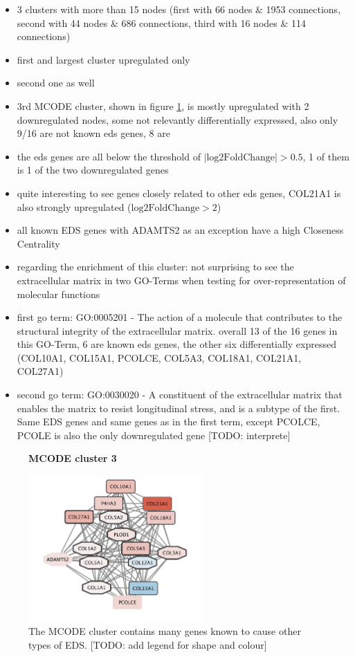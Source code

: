 \begin{itemize}
	\item 3 clusters with more than 15 nodes (first with 66 nodes \& 1953 connections, second with 44 nodes \& 686 connections, third with 16 nodes \& 114 connections)
	\item first and largest cluster upregulated only
	\item second one as well
	\item 3rd MCODE cluster, shown in figure \ref{fig:mcode3}, is mostly upregulated with 2 downregulated nodes, some not relevantly differentially expressed, also only 9/16 are not known eds genes, 8 are
	\item the eds genes are all below the threshold of $|\text{log2FoldChange}| > 0.5$, 1 of them is 1 of the two downregulated genes
	\item quite interesting to see genes closely related to other eds genes, COL21A1 is also strongly upregulated ($\text{log2FoldChange} > 2$)
	\item all known EDS genes with ADAMTS2 as an exception have a high Closeness Centrality
	\item regarding the enrichment of this cluster: not surprising to see the extracellular matrix in two GO-Terms when testing for over-representation of molecular functions
	\item first go term: GO:0005201 - The action of a molecule that contributes to the structural integrity of the extracellular matrix. overall 13 of the 16 genes in this GO-Term, 6 are known eds genes, the other six differentially expressed (COL10A1, COL15A1, PCOLCE, COL5A3, COL18A1, COL21A1, COL27A1)
	\item second go term: GO:0030020 - A constituent of the extracellular matrix that enables the matrix to resist longitudinal stress, and is a subtype of the first. Same EDS genes and same genes as in the first term, except PCOLCE, PCOLE is also the only downregulated gene [TODO: interprete]
\end{itemize}

\begin{figure}[htb!]
	\centering
	\caption*{\textbf{MCODE cluster 3}}
	\includegraphics[width=0.6\textwidth]{fig/MCODE-cluster3.png}
	\caption[MCODE cluster 3]{\centering The MCODE cluster contains many genes known to cause other types of EDS. [TODO: add legend for shape and colour]}
	\label{fig:mcode3}
\end{figure}

